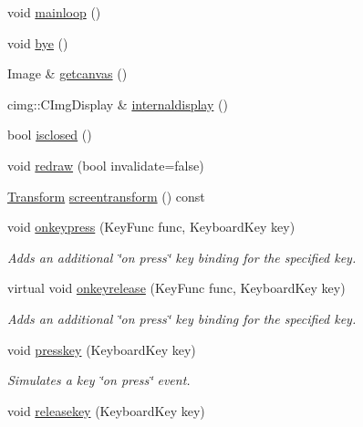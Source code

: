 \begin{DoxyCompactItemize}
\item 
void \hyperlink{classcturtle_1_1InteractiveTurtleScreen_a0b6a0f18333312f7d502b3d9a511143e}{mainloop} ()
\item 
void \hyperlink{classcturtle_1_1InteractiveTurtleScreen_a045b2cc0c8869140015abcc11226a714}{bye} ()
\item 
Image \& \hyperlink{classcturtle_1_1InteractiveTurtleScreen_ad2156553b1af3d0ab4527d8ddbda5d61}{getcanvas} ()
\item 
cimg\+::\+C\+Img\+Display \& \hyperlink{classcturtle_1_1InteractiveTurtleScreen_a0ea57bab0cb93f0fa4629747bddbab30}{internaldisplay} ()
\item 
bool \hyperlink{classcturtle_1_1InteractiveTurtleScreen_ab1809a5a10cb3afaa330d6ba2ee5bb49}{isclosed} ()
\item 
void \hyperlink{classcturtle_1_1InteractiveTurtleScreen_ad0e307da3f48e9e1ce6660c975ca3854}{redraw} (bool invalidate=false)
\item 
\hyperlink{classcturtle_1_1Transform}{Transform} \hyperlink{classcturtle_1_1InteractiveTurtleScreen_a6c81f204488e1ebe8180504990e559dc}{screentransform} () const
\item 
void \hyperlink{classcturtle_1_1InteractiveTurtleScreen_a997c82f379c6c90e2f1d2336db8bc1fc}{onkeypress} (Key\+Func func, Keyboard\+Key key)
\begin{DoxyCompactList}\small\item\em Adds an additional \char`\"{}on press\char`\"{} key binding for the specified key. \end{DoxyCompactList}\item 
virtual void \hyperlink{classcturtle_1_1InteractiveTurtleScreen_a313943b2ae07b9a67ae0681fbadc2085}{onkeyrelease} (Key\+Func func, Keyboard\+Key key)
\begin{DoxyCompactList}\small\item\em Adds an additional \char`\"{}on press\char`\"{} key binding for the specified key. \end{DoxyCompactList}\item 
void \hyperlink{classcturtle_1_1InteractiveTurtleScreen_a4273782c35444bc35afb0a8ea0f6a168}{presskey} (Keyboard\+Key key)
\begin{DoxyCompactList}\small\item\em Simulates a key \char`\"{}on press\char`\"{} event. \end{DoxyCompactList}\item 
void \hyperlink{classcturtle_1_1InteractiveTurtleScreen_a31a3f4a793acd97e8e6e8a42a7c7c885}{releasekey} (Keyboard\+Key key)

\end{DoxyCompactItemize}
